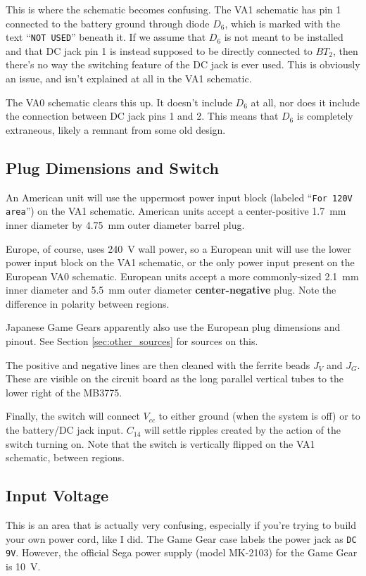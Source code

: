 \documentclass{article}
\newcommand{\Vcc}{$V_{cc}$}
\newcommand{\model}{\textsf}
\begin{document}
This is where the schematic becomes confusing. The \model{VA1}
schematic has pin 1 connected to the battery ground through diode
$D_6$, which is marked with the text ``\texttt{NOT USED}'' beneath
it. If we assume that $D_6$ is not meant to be installed and that DC
jack pin 1 is instead supposed to be directly connected to $BT_2$,
then there's no way the switching feature of the DC jack is ever
used. This is obviously an issue, and isn't explained at all in the
\model{VA1} schematic.

The \model{VA0} schematic clears this up. It doesn't include $D_6$ at
all, nor does it include the connection between DC jack pins 1 and
2. This means that $D_6$ is completely extraneous, likely a remnant
from some old design.

\subsection{Plug Dimensions and Switch}
\label{sec:plug_dimensions}
An American unit will use the uppermost power input block (labeled
``\texttt{For 120V area}'') on the \model{VA1} schematic. American
units accept a center-positive \qty{1.7}{\milli\meter} inner diameter
by \qty{4.75}{\milli\meter} outer diameter barrel plug.

Europe, of course, uses \qty{240}{\volt} wall power, so a European
unit will use the lower power input block on the \model{VA1}
schematic, or the only power input present on the European \model{VA0}
schematic. European units accept a more commonly-sized
\qty{2.1}{\milli\meter} inner diameter and \qty{5.5}{\milli\meter}
outer diameter \textbf{center-negative} plug. Note the difference in
polarity between regions.

Japanese Game Gears apparently also use the European plug dimensions
and pinout. See Section \ref{sec:other_sources} for sources on this.

The positive and negative lines are then cleaned with the ferrite
beads $J_V$ and $J_G$. These are visible on the circuit board as the
long parallel vertical tubes to the lower right of the \model{MB3775}.

Finally, the switch will connect \Vcc{} to either ground (when the
system is off) or to the battery/DC jack input. $C_{14}$ will settle
ripples created by the action of the switch turning on. Note that the
switch is vertically flipped on the \model{VA1} schematic, between
regions.

\subsection{Input Voltage}
This is an area that is actually very confusing, especially if you're
trying to build your own power cord, like I did. The Game Gear case
labels the power jack as \texttt{DC 9V}. However, the official Sega
power supply (model \model{MK-2103}) for the Game Gear is
\qty{10}{\volt}.
\end{document}
